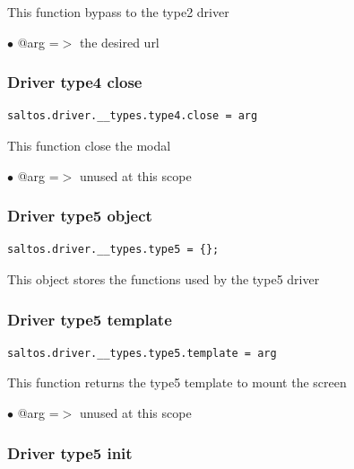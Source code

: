 \documentclass[a4paper]{article}
\begin{document}
This function bypass to the type2 driver

\begin{compactitem}
\item[\color{myblue}$\bullet$] @arg =$>$ the desired url
\end{compactitem}

\hypertarget{toc201}{}
\subsubsection{Driver type4 close}

\begin{lstlisting}
saltos.driver.__types.type4.close = arg
\end{lstlisting}

This function close the modal

\begin{compactitem}
\item[\color{myblue}$\bullet$] @arg =$>$ unused at this scope
\end{compactitem}

\hypertarget{toc202}{}
\subsubsection{Driver type5 object}

\begin{lstlisting}
saltos.driver.__types.type5 = {};
\end{lstlisting}

This object stores the functions used by the type5 driver

\hypertarget{toc203}{}
\subsubsection{Driver type5 template}

\begin{lstlisting}
saltos.driver.__types.type5.template = arg
\end{lstlisting}

This function returns the type5 template to mount the screen

\begin{compactitem}
\item[\color{myblue}$\bullet$] @arg =$>$ unused at this scope
\end{compactitem}

\hypertarget{toc204}{}
\subsubsection{Driver type5 init}
\end{document}
